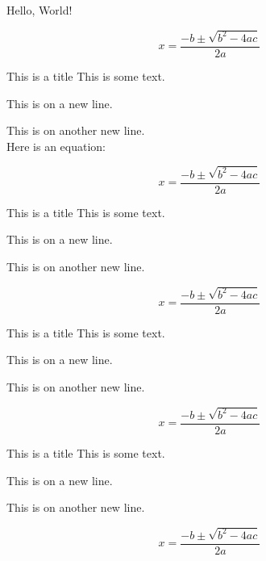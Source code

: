 Hello, World!



\lipsum[10]

\begin{equation*}
    x = \frac{-b \pm \sqrt{b^2 - 4ac}}{2a}
\end{equation*}

\begin{greybox}{This is a title}
    This is some text.

    This is on a new line.

    This is on another new line.\\
    Here is an equation:

    \begin{equation*}
        x = \frac{-b \pm \sqrt{b^2 - 4ac}}{2a}
    \end{equation*}
\end{greybox}

\begin{redbox}{This is a title}
    This is some text.

    This is on a new line.

    This is on another new line.

    \begin{equation*}
        x = \frac{-b \pm \sqrt{b^2 - 4ac}}{2a}
    \end{equation*}
\end{redbox}

\begin{bluebox}{This is a title}
    This is some text.

    This is on a new line.

    This is on another new line.

    \begin{equation*}
        x = \frac{-b \pm \sqrt{b^2 - 4ac}}{2a}
    \end{equation*}
\end{bluebox}

\begin{greenbox}{This is a title}
    This is some text.

    This is on a new line.

    This is on another new line.

    \begin{equation*}
        x = \frac{-b \pm \sqrt{b^2 - 4ac}}{2a}
    \end{equation*}
\end{greenbox}

